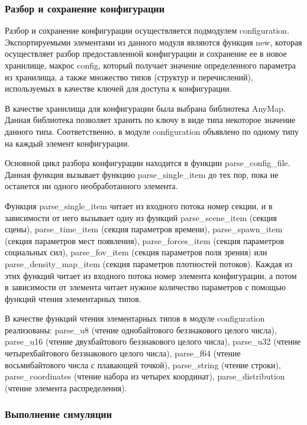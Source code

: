 \subsubsection{Разбор и сохранение конфигурации}
\label{sec:development:core:configuration}

Разбор и сохранение конфигурации осуществляется подмодулем con\-fi\-gu\-ra\-ti\-on.
Экспортируемыми элементами из данного модуля являются
функция new, которая осуществляет разбор предоставленной конфигурации и сохранение ее в новое хранилище,
макрос config, который получает значение определенного параметра из хранилища,
а также множество типов (структур и перечислений), используемых в качестве ключей для доступа к конфигурации.

В качестве хранилища для конфигурации была выбрана библиотека AnyMap.
Данная библиотека позволяет хранить по ключу в виде типа некоторое значение данного типа.
Соответственно, в модуле configuration объявлено по одному типу на каждый элемент конфигурации.

Основной цикл разбора конфигурации находится в функции par\-se\_con\-fig\_fi\-le.
Данная функция вызывает функцию par\-se\_sin\-gle\_item до тех пор, пока не останется ни одного необработанного элемента.

Функция parse\_single\_item читает из входного потока номер секции, и в зависимости от него вызывает одну из функций
par\-se\_sce\-ne\_item (секция сцены), par\-se\_time\_item (секция параметров времени),
par\-se\_spawn\_item (секция параметров мест появления),
par\-se\_for\-ces\_item (секция параметров социальных сил),
par\-se\_fov\_item (секция параметров поля зрения)
или par\-se\_den\-si\-ty\_map\_item (секция параметров плотностей потоков).
Каждая из этих функций читает из входного потока номер элемента конфигурации,
а потом в зависимости от элемента читает нужное количество параметров с помощью функций чтения элементарных типов.

В качестве функций чтения элементарных типов в модуле configuration реализованы:
par\-se\_u8 (чтение однобайтового беззнакового целого числа),
par\-se\_u16 (чтение двухбайтового беззнакового целого числа),
par\-se\_u32 (чтение четырехбайтового беззнакового целого числа),
par\-se\_f64 (чтение восьмибайтового числа с плавающей точкой),
par\-se\_string (чтение строки),
par\-se\_co\-or\-di\-na\-tes (чтение набора из четырех координат),
par\-se\_dis\-tri\-bu\-ti\-on (чтение элемента распределения).

\subsubsection{Выполнение симуляции}
\label{sec:development:core:simulation}

